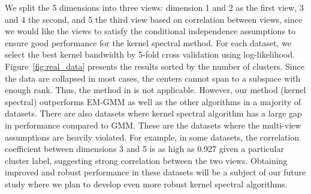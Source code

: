 \documentclass{article}
\newcommand{\aacomment}[1]{\noindent{\textcolor{blue}{\textbf{\#\#\# AA:} \textsf{#1} \#\#\#}}}
\begin{document}
We split the 5 dimensions into three views: dimension 1 and 2 as the first view, 3 and 4 the second, and 5 the third view based on correlation between views, since we would like the views to satisfy the conditional independence assumptions to ensure good performance for the kernel spectral method. For each dataset, we select the best kernel bandwidth by 5-fold cross validation using log-likelihood. Figure~\ref{fig:real_data} presents the results sorted by the number of clusters. Since the data are collapsed in most cases, the centers cannot span to a subspace with enough rank. Thus, the method in \citep{HsuKak13} is not applicable. However, our method (kernel spectral) outperforms EM-GMM as well as the other algorithms in a majority of datasets. There are also datasets where kernel spectral algorithm has a large gap in performance compared to GMM. These are the datasets where the multi-view assumptions are heavily violated. For example, in some datasets, the correlation coefficient between dimensions 3 and 5 is as high as 0.927 given a particular cluster label, suggesting strong correlation between the two views. Obtaining improved and robust performance in these datasets will be a subject of our future study where we plan to develop even more robust kernel spectral algorithms. 

%
\end{document}
